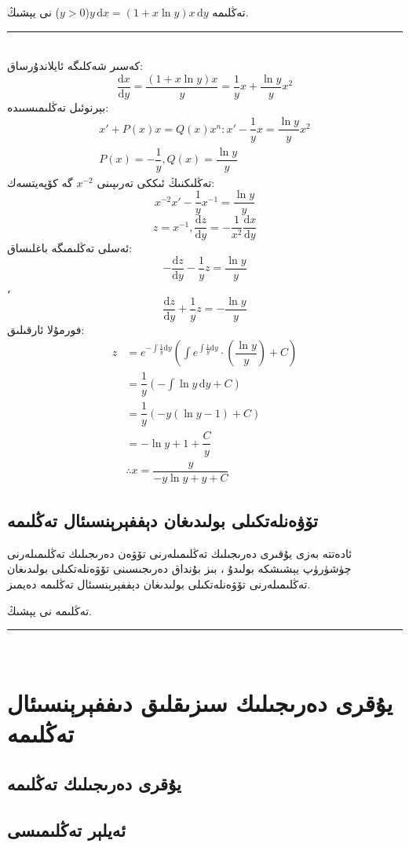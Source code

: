 \begin{myexample}
	تەڭلىمە
	$y\,\textrm{d}x=(1+x\ln y)x\,\textrm{d}y$($y>0$)
	نى يېشىڭ.
	\\\rule{\linewidth}{0.05em}\\
	كەسىر شەكلىگە ئايلاندۇرساق: 
	$$\dfrac{\textrm{d}x}{\textrm{d}y}=\dfrac{(1+x\ln y)x}{y}=\dfrac{1}{y}x+\dfrac{\ln y}{y}x^2$$
	بېرنوئىل تەڭلىمىسىىدە:
	\begin{align*}
		x'+P(x)x=Q(x)x^n : x'-\dfrac{1}{y}x=\dfrac{\ln y}{y}x^2\\
		P(x)=-\dfrac{1}{y}, Q(x)=\dfrac{\ln y}{y}
	\end{align*}
تەڭلىكنىڭ ئىككى تەرىپىنى
	$x^{-2}$
	گە كۆپەيتسەك:
	$$x^{-2}x'-\dfrac{1}{y}x^{-1}=\dfrac{\ln y}{y}$$ $$z=x^{-1}, \dfrac{\textrm{d}z}{\textrm{d}y}=-\dfrac{1}{x^2}\dfrac{\textrm{d}x}{\textrm{d}y}$$
	ئەسلى تەڭلىمىگە باغلىساق:
	$$-\dfrac{\textrm{d}z}{\textrm{d}y}-\dfrac{1}{y}z=\dfrac{\ln y}{y}$$،$$\dfrac{\textrm{d}z}{\textrm{d}y}+\dfrac{1}{y}z=-\dfrac{\ln y}{y}$$
	فورمۇلا ئارقىلىق:
	\begin{align*}
	z &= e^{-\int\frac{1}{y}\textrm{d}y}\left(\displaystyle{\int e^{\int\frac{1}{y}\textrm{d}y}\cdot\left(\dfrac{\ln y}{y}\right)+C}\right)\\
	&=  \dfrac{1}{y}(-\int\ln y\,\textrm{d}y+C)\\
	&= \dfrac{1}{y}(-y(\ln y-1)+C)\\
	&= -\ln y+1+\dfrac{C}{y}\\
	&\therefore x = \dfrac{y}{-y\ln y+y+C}
	\end{align*}
\end{myexample}

\subsection{تۆۋەنلەتكىلى بولىدىغان دېففېرېنسىئال تەڭلىمە}
 ئادەتتە بەزى يۇقىرى دەرىجىلىك تەڭلىمىلەرنى تۆۋەن دەرىجىلىك تەڭلىمىلەرنى چۈشۈرۈپ يېشىشكە بولىدۇ ،  بىز بۇنداق دەرىجىسىنى تۆۋەنلەتكىلى بولىدىغان تەڭلىمىلەرنى تۆۋەنلەتكىلى بولىدىغان دېففېرېنسىئال تەڭلىمە دەيمىز.

\begin{myexample}
	تەڭلىمە
	نى يېشىڭ.
	\\\rule{\linewidth}{0.05em}\\
	
\end{myexample}
\section{يۇقرى دەرىجىلىك سىزىقلىق دىففېرېنسىئال تەڭلىمە}
\subsection{يۇقرى دەرىجىلىك تەڭلىمە}
\subsection{ئەيلېر تەڭلىمىسى}


